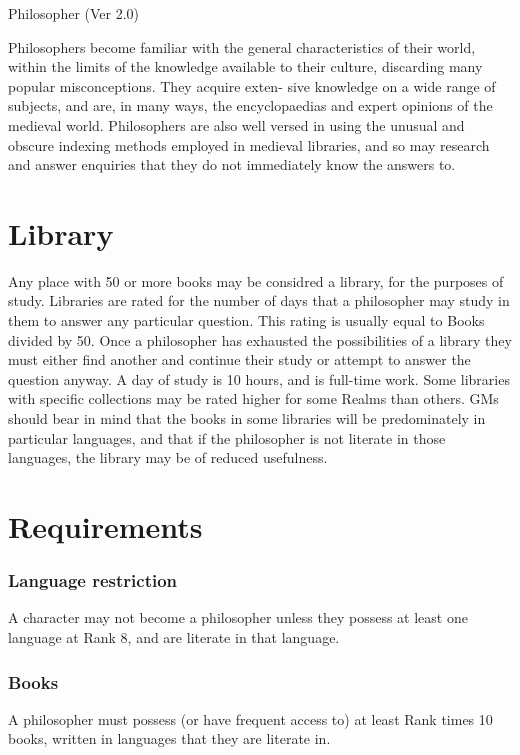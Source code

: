 \begin{Chapter}{Philosopher (Ver 2.0)}

Philosophers become familiar with the general characteristics of their
world, within the limits of the knowledge available to their culture,
discarding many popular misconceptions. They acquire exten- sive
knowledge on a wide range of subjects, and are, in many ways, the
encyclopaedias and expert opinions of the medieval world.
Philosophers are also well versed in using the unusual and obscure
indexing methods employed in medieval libraries, and so may research
and answer enquiries that they do not immediately know the answers to.

\section{Library}
Any place with 50 or more books may be considred a library, for the
purposes of study.  Libraries are rated for the number of days that a
philosopher may study in them to answer any particular question. This
rating is usually equal to Books divided by 50. Once a philosopher has
exhausted the possibilities of a library they must either find another
and continue their study or attempt to answer the question anyway. A
day of study is 10 hours, and is full-time work. Some libraries with
specific collections may be rated higher for some Realms than
others. GMs should bear in mind that the books in some libraries will
be predominately in particular languages, and that if the philosopher
is not literate in those languages, the library may be of reduced
usefulness.

\section{Requirements}

\subsubsection{Language restriction}

A character may not become a philosopher unless they possess at least
one language at Rank 8, and are literate in that language.

\subsubsection{Books}

A philosopher must possess (or have frequent access to) at least Rank
times 10 books, written in languages that they are literate in.


\end{Chapter}
